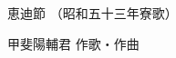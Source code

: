 \documentclass[10pt,b5j]{tarticle} %
\begin{document}
\begin{minipage}[c]{0.7\hsize} %
    \begin{center}
        {\LARGE
            恵迪節 %
        }
        {\small 
            （昭和五十三年寮歌） %
        }
    \end{center}
\end{minipage}
\begin{minipage}[c]{0.3\hsize} %
    \begin{flushright} %
        甲斐陽輔君 作歌・作曲 %
    \end{flushright}
\end{minipage}
\end{document}
